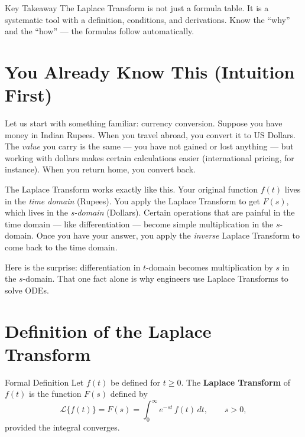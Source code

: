 \documentclass[12pt,a4paper]{article}
\begin{document}
\begin{learnbox}{Key Takeaway}
The Laplace Transform is not just a formula table. It is a systematic tool with a definition, conditions, and derivations. Know the ``why'' and the ``how'' --- the formulas follow automatically.
\end{learnbox}

\section{You Already Know This (Intuition First)}

Let us start with something familiar: currency conversion. Suppose you have money in Indian Rupees. When you travel abroad, you convert it to US Dollars. The \emph{value} you carry is the same --- you have not gained or lost anything --- but working with dollars makes certain calculations easier (international pricing, for instance). When you return home, you convert back.

\medskip

The Laplace Transform works exactly like this. Your original function $f(t)$ lives in the \emph{time domain} (Rupees). You apply the Laplace Transform to get $F(s)$, which lives in the \emph{s-domain} (Dollars). Certain operations that are painful in the time domain --- like differentiation --- become simple multiplication in the $s$-domain. Once you have your answer, you apply the \emph{inverse} Laplace Transform to come back to the time domain.

\medskip

Here is the surprise: differentiation in $t$-domain becomes multiplication by $s$ in the $s$-domain. That one fact alone is why engineers use Laplace Transforms to solve ODEs.

\section{Definition of the Laplace Transform}

\begin{infobox}{Formal Definition}
Let $f(t)$ be defined for $t \geq 0$. The \textbf{Laplace Transform} of $f(t)$ is the function $F(s)$ defined by
\[
\mathcal{L}\{f(t)\} = F(s) = \int_0^{\infty} e^{-st}\, f(t)\, dt, \qquad s > 0,
\]
provided the integral converges.
\end{infobox}
\end{document}
